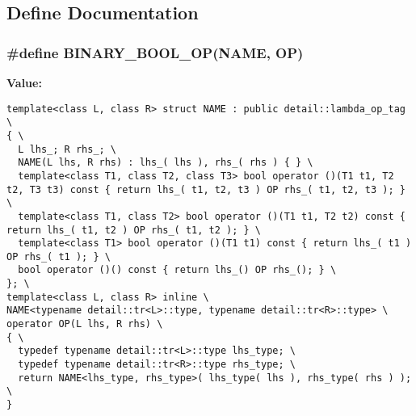 \subsection{Define Documentation}
\subsubsection{\setlength{\rightskip}{0pt plus 5cm}\#define BINARY\_\-BOOL\_\-OP(NAME, OP)}\label{lambda_8hpp_3705a18f2aa3aec04833a934da1226ac}


\textbf{Value:}

\begin{Code}\begin{verbatim}template<class L, class R> struct NAME : public detail::lambda_op_tag \
{ \
  L lhs_; R rhs_; \
  NAME(L lhs, R rhs) : lhs_( lhs ), rhs_( rhs ) { } \
  template<class T1, class T2, class T3> bool operator ()(T1 t1, T2 t2, T3 t3) const { return lhs_( t1, t2, t3 ) OP rhs_( t1, t2, t3 ); } \
  template<class T1, class T2> bool operator ()(T1 t1, T2 t2) const { return lhs_( t1, t2 ) OP rhs_( t1, t2 ); } \
  template<class T1> bool operator ()(T1 t1) const { return lhs_( t1 ) OP rhs_( t1 ); } \
  bool operator ()() const { return lhs_() OP rhs_(); } \
}; \
template<class L, class R> inline \
NAME<typename detail::tr<L>::type, typename detail::tr<R>::type> \
operator OP(L lhs, R rhs) \
{ \
  typedef typename detail::tr<L>::type lhs_type; \
  typedef typename detail::tr<R>::type rhs_type; \
  return NAME<lhs_type, rhs_type>( lhs_type( lhs ), rhs_type( rhs ) ); \
}
\end{verbatim}\end{Code}
